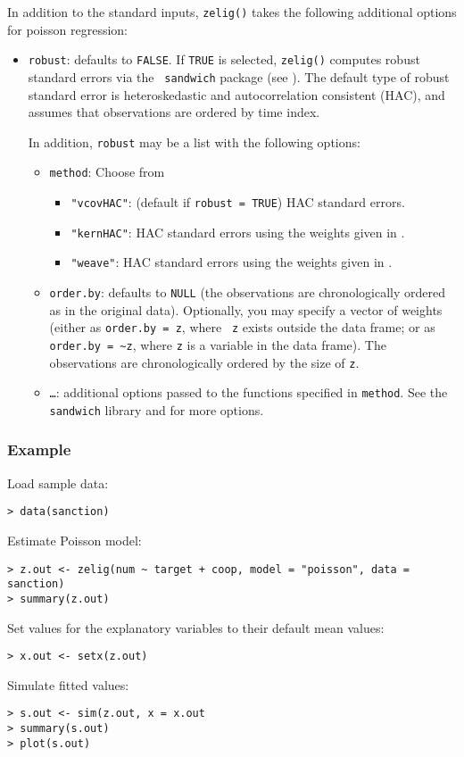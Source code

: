 In addition to the standard inputs, {\tt zelig()} takes the following
additional options for poisson regression:  
\begin{itemize}
\item {\tt robust}: defaults to {\tt FALSE}.  If {\tt TRUE} is
selected, {\tt zelig()} computes robust standard errors via the {\tt
sandwich} package (see \cite{Zeileis04}).  The default type of robust
standard error is heteroskedastic and autocorrelation consistent (HAC),
and assumes that observations are ordered by time index.

In addition, {\tt robust} may be a list with the following options:  
\begin{itemize}
\item {\tt method}:  Choose from 
\begin{itemize}
\item {\tt "vcovHAC"}: (default if {\tt robust = TRUE}) HAC standard
errors. 
\item {\tt "kernHAC"}: HAC standard errors using the
weights given in \cite{Andrews91}. 
\item {\tt "weave"}: HAC standard errors using the
weights given in \cite{LumHea99}.  
\end{itemize}  
\item {\tt order.by}: defaults to {\tt NULL} (the observations are
chronologically ordered as in the original data).  Optionally, you may
specify a vector of weights (either as {\tt order.by = z}, where {\tt
z} exists outside the data frame; or as {\tt order.by = \~{}z}, where
{\tt z} is a variable in the data frame).  The observations are
chronologically ordered by the size of {\tt z}.
\item {\tt \dots}:  additional options passed to the functions 
specified in {\tt method}.   See the {\tt sandwich} library and
\cite{Zeileis04} for more options.   
\end{itemize}
\end{itemize}

\subsubsection{Example}

Load sample data:  
\begin{verbatim}
> data(sanction)
\end{verbatim}
Estimate Poisson model:  
\begin{verbatim}
> z.out <- zelig(num ~ target + coop, model = "poisson", data = sanction)
> summary(z.out)
\end{verbatim}
Set values for the explanatory variables to their default mean values:  
\begin{verbatim}
> x.out <- setx(z.out)
\end{verbatim}
Simulate fitted values:  
\begin{verbatim}
> s.out <- sim(z.out, x = x.out
> summary(s.out)
> plot(s.out)
\end{verbatim}

